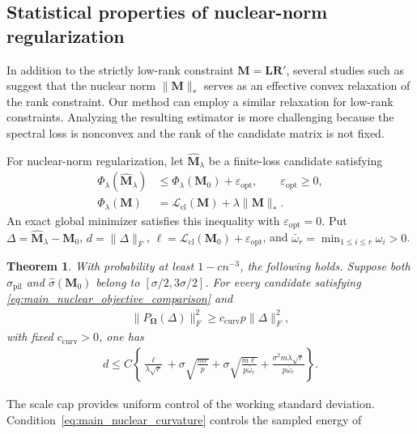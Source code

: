 \documentclass[numsec,webpdf,modern,large,namedate]{oup-authoring-template}
\theoremstyle{plain}
\newtheorem{theorem}{Theorem}[section]
\theoremstyle{remark}
\newcommand{\M}{\bm{M}}
\newcommand{\bOmega}{\bm{\Omega}}
\newcommand{\bL}{\bm{L}}
\newcommand{\R}{\bm{R}}
\newif\ifmarkchanges
\newenvironment{revision}{\begingroup\ifmarkchanges\color{red}\fi}{\endgroup}
\begin{document}
\begin{revision}
\subsection{Statistical properties of nuclear-norm regularization}
\label{sec:4.2}
In addition to the strictly low-rank constraint $\M=\bL\R'$, several studies such as \cite{candes2009exact} suggest that the nuclear norm $\|\M\|_*$ serves as an effective convex relaxation of the rank constraint. Our method can employ a similar relaxation for low-rank constraints. Analyzing the resulting estimator is more challenging because the spectral loss is nonconvex and the rank of the candidate matrix is not fixed.

For nuclear-norm regularization, let $\widehat{\M}_\lambda$ be a finite-loss
candidate satisfying
\begin{align}
 \Phi_\lambda(\widehat{\M}_\lambda)
 &\le\Phi_\lambda(\M_0)+\varepsilon_{\mathrm{opt}},
       \qquad\varepsilon_{\mathrm{opt}}\ge0,\nonumber\\
 \Phi_\lambda(\M)&=\mathcal L_{\mathrm{cl}}(\M)+\lambda\|\M\|_*.
 \label{eq:main_nuclear_objective_comparison}
\end{align}
An exact global minimizer satisfies this inequality with
$\varepsilon_{\mathrm{opt}}=0$. Put
$\Delta=\widehat{\M}_\lambda-\M_0$, $d=\|\Delta\|_F$,
$\ell=\mathcal L_{\mathrm{cl}}(\M_0)+\varepsilon_{\mathrm{opt}}$, and
$\bar\omega_r=\min_{1\le i\le r}\omega_i>0$.
\begin{theorem}
\label{thm:upper_bound_for_convexlambda}
With probability at least $1-cn^{-3}$, the following holds. Suppose both
$\widehat\sigma_{\mathrm{pil}}$ and $\widehat\sigma(\M_0)$ belong to
$[\sigma/2,3\sigma/2]$. For every candidate satisfying
\eqref{eq:main_nuclear_objective_comparison} and
\begin{align}
 \|P_{\bOmega}(\Delta)\|_F^2
       \ge c_{\mathrm{curv}}p\|\Delta\|_F^2,
 \label{eq:main_nuclear_curvature}
\end{align}
with fixed $c_{\mathrm{curv}}>0$, one has
\begin{align*}
 d\le C\left\{
 \frac{\ell}{\lambda\sqrt r}+\sigma\sqrt{\frac{mr}{p}}
 +\sigma\sqrt{\frac{m\ell}{p\bar\omega_r}}
 +\frac{\sigma^2m\lambda\sqrt r}{p\bar\omega_r}\right\}.
\end{align*}
\end{theorem}
The scale cap provides uniform control of the working standard deviation.
Condition~\eqref{eq:main_nuclear_curvature} controls the sampled energy of

\end{revision}
\end{document}
